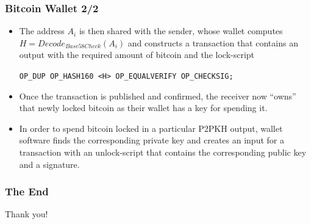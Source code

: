 \documentclass{beamer}
\begin{document}
\begin{frame}[fragile]
  \frametitle{Bitcoin Wallet 2/2}
  \begin{itemize}
  \item The address $A_i$ is then shared with the sender, whose wallet computes
    $H = Decode_{Base58Check}(A_i)$ and constructs a transaction that
    contains an output with the required amount of bitcoin and the lock-script
    \begin{center}
      \tiny\texttt{OP_DUP OP_HASH160 <H> OP_EQUALVERIFY OP_CHECKSIG;}
    \end{center}
  \item Once the transaction is published and confirmed, the receiver now
    ``owns'' that newly locked bitcoin as their wallet has a key for spending
    it.
  \item In order to spend bitcoin locked in a particular P2PKH output, wallet
    software finds the corresponding private key and creates an input for a
    transaction with an unlock-script that contains the corresponding public key
    and a signature.
  \end{itemize}
\end{frame}

\begin{frame}
  \frametitle{The End}
  \begin{center}
    Thank you!
  \end{center}
\end{frame}
\end{document}
